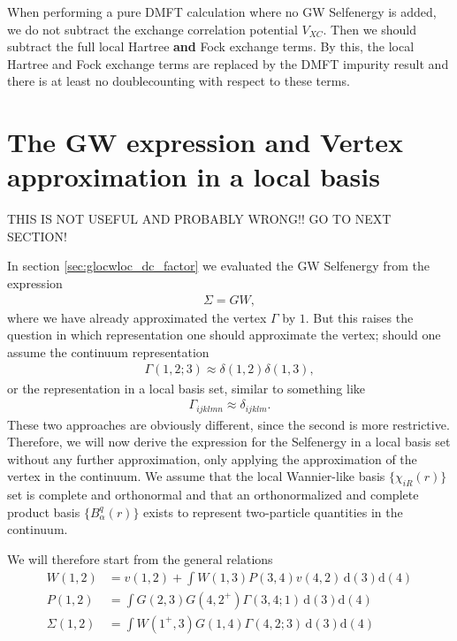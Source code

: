 \documentclass[12pt,a4paper]{scrartcl}
\numberwithin{equation}{section}
\newcommand{\cng}[1]{{\color{red}#1}}
\begin{document}
When performing a pure DMFT calculation where no GW Selfenergy is added,
we do not subtract the exchange correlation potential $V_{XC}$.
Then we should subtract the full local Hartree \textbf{and} Fock exchange terms.
By this, the local Hartree and Fock exchange terms are replaced by the DMFT impurity
result and there is at least no doublecounting with respect to these terms. 



\clearpage 

\section{The GW expression and Vertex approximation in a local basis}
\cng{THIS IS NOT USEFUL AND PROBABLY WRONG!! GO TO NEXT SECTION!}

In section \ref{sec:glocwloc_dc_factor} we evaluated the GW Selfenergy
from the expression 
\begin{align}
 \Sigma = GW,
\end{align}
where we have already approximated the vertex $\Gamma$ by $1$.
But this raises the question in which representation one should approximate
the vertex; should one assume the continuum representation
\begin{align}
 \Gamma(1,2;3) \approx  \delta(1,2)\delta(1,3),
\end{align}
or the representation in a local basis set, similar to something like
\begin{align}
 \Gamma_{ijklmn} \approx  \delta_{ijklm} .
\end{align}
These two approaches are obviously different, since the second is more restrictive.
Therefore, we will now derive the expression for the Selfenergy
in a local basis set without any further approximation, only
applying the approximation of the vertex in the continuum.
We assume that the local Wannier-like basis $\{ \chi_{iR}(r) \}$ set is complete 
and orthonormal 
and that an orthonormalized and complete product basis $\{ B^q_\alpha(r) \}$
exists to represent two-particle quantities in the continuum.

We will therefore start from the general relations
\begin{align}
W(1,2)
 &= v(1,2)
  + \int  W(1,3) P(3,4) v(4,2) \, \mathrm{d}(3)\mathrm{d}(4) \label{eq:w_continuum} \\
%
P(1,2) &= \int G(2,3)G(4,2^+) \Gamma(3,4;1) \, \mathrm{d}(3)\mathrm{d}(4) \\
%
\Sigma(1,2)
&= \int W(1^+,3) G(1,4) \Gamma(4,2;3) \, \mathrm{d}(3)\mathrm{d}(4)
\end{align}
\end{document}

